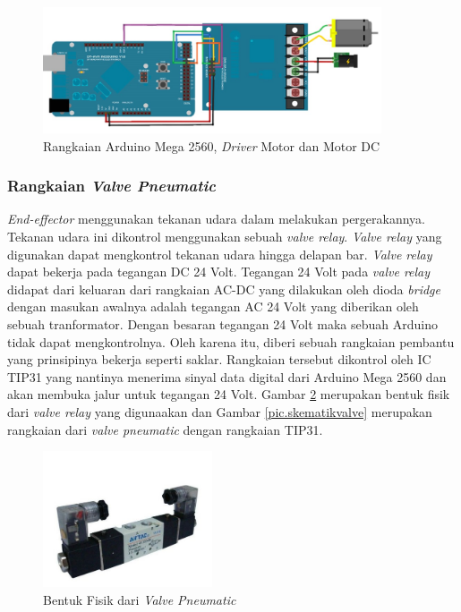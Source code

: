 \begin{figure}[H]
	\centering
	\includegraphics[width=10cm]{gambar/drivermotor.jpg}
	\caption{Rangkaian Arduino Mega 2560, \textit{Driver} Motor dan Motor DC}
	\label{pic.motordcdriver}
\end{figure}
\subsubsection{Rangkaian \textit{Valve Pneumatic}}
\textit{End-effector} menggunakan tekanan udara dalam melakukan pergerakannya. Tekanan udara ini dikontrol menggunakan sebuah \textit{valve relay}. \textit{Valve relay} yang digunakan dapat mengkontrol tekanan udara hingga delapan bar. \textit{Valve relay} dapat bekerja pada tegangan DC 24 Volt. Tegangan 24 Volt pada \textit{valve relay} didapat dari keluaran dari rangkaian AC-DC yang dilakukan oleh dioda \textit{bridge} dengan masukan awalnya adalah tegangan AC 24 Volt yang diberikan oleh sebuah tranformator. Dengan besaran tegangan 24 Volt maka sebuah Arduino tidak dapat mengkontrolnya. Oleh karena itu, diberi sebuah rangkaian pembantu yang prinsipinya bekerja seperti saklar. Rangkaian tersebut dikontrol oleh IC TIP31 yang nantinya  menerima sinyal data digital dari Arduino Mega 2560 dan akan membuka jalur untuk tegangan 24 Volt. Gambar \ref{pic.fisikvalve} merupakan bentuk fisik dari \textit{valve relay} yang digunaakan dan Gambar \ref{pic.skematikvalve} merupakan rangkaian dari \textit{valve pneumatic} dengan rangkaian TIP31.
\begin{figure}[H]
	\centering
	\includegraphics[width=5cm]{gambar/relay.jpg}
	\caption{Bentuk Fisik dari \textit{Valve Pneumatic}}
	\label{pic.fisikvalve}
\end{figure}
